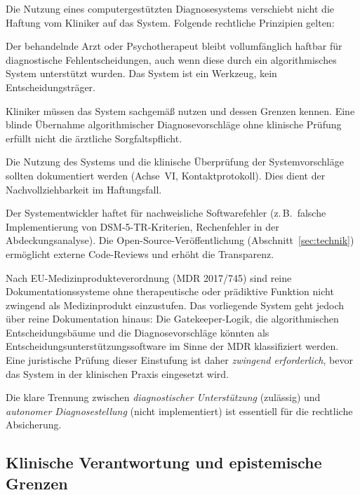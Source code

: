 \documentclass[11pt,a4paper]{article}
\begin{document}
Die Nutzung eines computergest\"utzten Diagnosesystems verschiebt nicht die Haftung vom Kliniker auf das System. Folgende rechtliche Prinzipien gelten:

\begin{description}[style=nextline, leftmargin=1.5cm, font=\bfseries]
\item[Behandler-Haftung bleibt bestehen] Der behandelnde Arzt oder Psychotherapeut bleibt vollumf\"anglich haftbar f\"ur diagnostische Fehlentscheidungen, auch wenn diese durch ein algorithmisches System unterst\"utzt wurden. Das System ist ein Werkzeug, kein Entscheidungstr\"ager.
\item[Sorgfaltspflicht bei Systemnutzung] Kliniker m\"ussen das System sachgem\"a\ss{} nutzen und dessen Grenzen kennen. Eine blinde \"Ubernahme algorithmischer Diagnosevorschl\"age ohne klinische Pr\"ufung erf\"ullt nicht die \"arztliche Sorgfaltspflicht.
\item[Dokumentationspflicht] Die Nutzung des Systems und die klinische \"Uberpr\"ufung der Systemvorschl\"age sollten dokumentiert werden (Achse~VI, Kontaktprotokoll). Dies dient der Nachvollziehbarkeit im Haftungsfall.
\item[Produkthaftung des Entwicklers] Der Systementwickler haftet f\"ur nachweisliche Softwarefehler (z.\,B.\ falsche Implementierung von DSM-5-TR-Kriterien, Rechenfehler in der Abdeckungsanalyse). Die Open-Source-Ver\"offentlichung (Abschnitt~\ref{sec:technik}) erm\"oglicht externe Code-Reviews und erh\"oht die Transparenz.
\item[Medizinprodukt-Einstufung bedarf juristischer Kl\"arung] Nach EU-Medizinprodukteverordnung (MDR 2017/745) sind reine Dokumentationssysteme ohne therapeutische oder pr\"adiktive Funktion nicht zwingend als Medizinprodukt einzustufen. Das vorliegende System geht jedoch \"uber reine Dokumentation hinaus: Die Gatekeeper-Logik, die algorithmischen Entscheidungsb\"aume und die Diagnosevorschl\"age k\"onnten als Entscheidungsunterst\"utzungssoftware im Sinne der MDR klassifiziert werden. Eine juristische Pr\"ufung dieser Einstufung ist daher \textit{zwingend erforderlich}, bevor das System in der klinischen Praxis eingesetzt wird.
\end{description}

Die klare Trennung zwischen \textit{diagnostischer Unterst\"utzung} (zul\"assig) und \textit{autonomer Diagnosestellung} (nicht implementiert) ist essentiell f\"ur die rechtliche Absicherung.

\subsection{Klinische Verantwortung und epistemische Grenzen}
\end{document}
